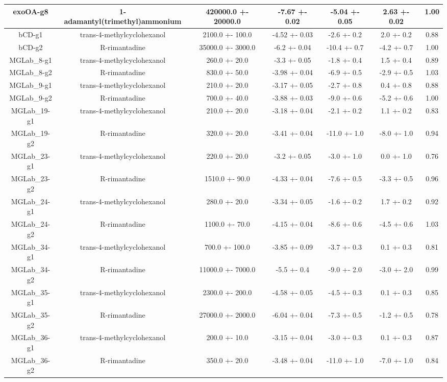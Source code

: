 \documentclass{article}
\begin{document}
\begin{center}
\begin{tabu}{| c | c | c | c | c | c | c |}
\hline
exoOA-g8 & 1-adamantyl(trimethyl)ammonium & 420000.0 +- 20000.0 & -7.67 +- 0.02 & -5.04 +- 0.05 & 2.63 +- 0.02 &  1.00 \\
\hline
\hline
bCD-g1 & trans-4-methylcyclohexanol & 2100.0 +- 100.0 & -4.52 +- 0.03 & -2.6 +- 0.2 & 2.0 +- 0.2 &  0.88 \\
\hline
bCD-g2 & R-rimantadine & 35000.0 +- 3000.0 & -6.2 +- 0.04 & -10.4 +- 0.7 & -4.2 +- 0.7 &  1.00 \\
\hline
\hline
MGLab\_8-g1 & trans-4-methylcyclohexanol & 260.0 +- 20.0 & -3.3 +- 0.05 & -1.8 +- 0.4 & 1.5 +- 0.4 &  0.89 \\
\hline
MGLab\_8-g2 & R-rimantadine & 830.0 +- 50.0 & -3.98 +- 0.04 & -6.9 +- 0.5 & -2.9 +- 0.5 &  1.03 \\
\hline
\hline
MGLab\_9-g1 & trans-4-methylcyclohexanol & 210.0 +- 20.0 & -3.17 +- 0.05 & -2.7 +- 0.8 & 0.4 +- 0.8 &  0.88 \\
\hline
MGLab\_9-g2 & R-rimantadine & 700.0 +- 40.0 & -3.88 +- 0.03 & -9.0 +- 0.6 & -5.2 +- 0.6 &  1.00 \\
\hline
\hline
MGLab\_19-g1 & trans-4-methylcyclohexanol & 210.0 +- 20.0 & -3.18 +- 0.04 & -2.1 +- 0.2 & 1.1 +- 0.2 &  0.83 \\
\hline
MGLab\_19-g2 & R-rimantadine & 320.0 +- 20.0 & -3.41 +- 0.04 & -11.0 +- 1.0 & -8.0 +- 1.0 &  0.94 \\
\hline
\hline
MGLab\_23-g1 & trans-4-methylcyclohexanol & 220.0 +- 20.0 & -3.2 +- 0.05 & -3.0 +- 1.0 & 0.0 +- 1.0 &  0.76 \\
\hline
MGLab\_23-g2 & R-rimantadine & 1510.0 +- 90.0 & -4.33 +- 0.04 & -7.6 +- 0.5 & -3.3 +- 0.5 &  0.96 \\
\hline
\hline
MGLab\_24-g1 & trans-4-methylcyclohexanol & 280.0 +- 20.0 & -3.34 +- 0.05 & -1.6 +- 0.2 & 1.7 +- 0.2 &  0.92 \\
\hline
MGLab\_24-g2 & R-rimantadine & 1100.0 +- 70.0 & -4.15 +- 0.04 & -8.6 +- 0.6 & -4.5 +- 0.6 &  1.03 \\
\hline
\hline
MGLab\_34-g1 & trans-4-methylcyclohexanol & 700.0 +- 100.0 & -3.85 +- 0.09 & -3.7 +- 0.3 & 0.1 +- 0.3 &  0.81 \\
\hline
MGLab\_34-g2 & R-rimantadine & 11000.0 +- 7000.0 & -5.5 +- 0.4 & -9.0 +- 2.0 & -3.0 +- 2.0 &  0.99 \\
\hline
\hline
MGLab\_35-g1 & trans-4-methylcyclohexanol & 2300.0 +- 200.0 & -4.58 +- 0.05 & -4.5 +- 0.3 & 0.1 +- 0.3 &  0.85 \\
\hline
MGLab\_35-g2 & R-rimantadine & 27000.0 +- 2000.0 & -6.04 +- 0.04 & -7.3 +- 0.5 & -1.2 +- 0.5 &  0.78 \\
\hline
\hline
MGLab\_36-g1 & trans-4-methylcyclohexanol & 200.0 +- 10.0 & -3.15 +- 0.04 & -3.0 +- 0.3 & 0.1 +- 0.3 &  0.87 \\
\hline
MGLab\_36-g2 & R-rimantadine & 350.0 +- 20.0 & -3.48 +- 0.04 & -11.0 +- 1.0 & -7.0 +- 1.0 &  0.84 \\
\hline
\end{tabu}\end{center}\vspace{5mm}
\end{document}

